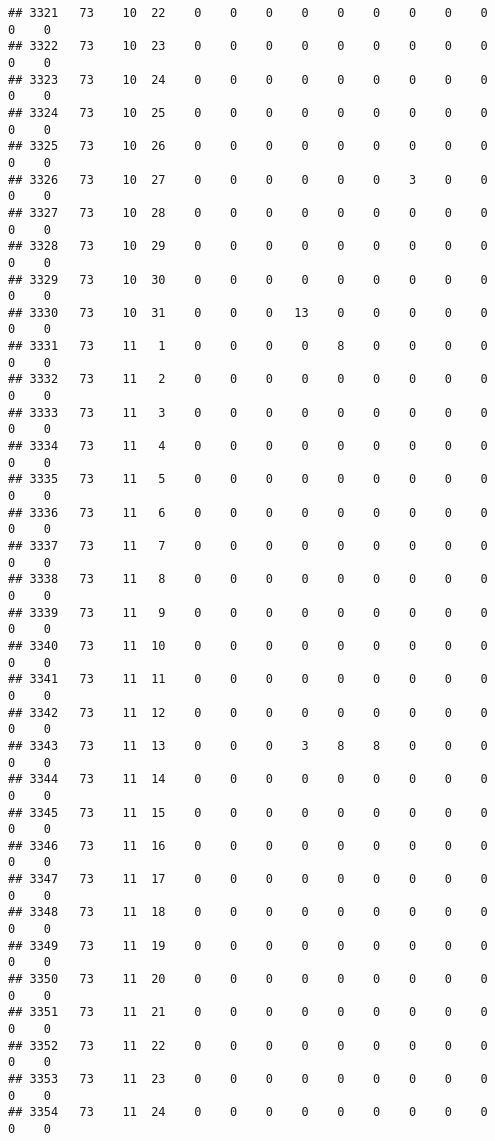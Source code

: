 \documentclass[]{article}
\begin{document}
\begin{verbatim}
## 3321   73    10  22    0    0    0    0    0    0    0    0    0    0    0
## 3322   73    10  23    0    0    0    0    0    0    0    0    0    0    0
## 3323   73    10  24    0    0    0    0    0    0    0    0    0    0    0
## 3324   73    10  25    0    0    0    0    0    0    0    0    0    0    0
## 3325   73    10  26    0    0    0    0    0    0    0    0    0    0    0
## 3326   73    10  27    0    0    0    0    0    0    3    0    0    0    0
## 3327   73    10  28    0    0    0    0    0    0    0    0    0    0    0
## 3328   73    10  29    0    0    0    0    0    0    0    0    0    0    0
## 3329   73    10  30    0    0    0    0    0    0    0    0    0    0    0
## 3330   73    10  31    0    0    0   13    0    0    0    0    0    0    0
## 3331   73    11   1    0    0    0    0    8    0    0    0    0    0    0
## 3332   73    11   2    0    0    0    0    0    0    0    0    0    0    0
## 3333   73    11   3    0    0    0    0    0    0    0    0    0    0    0
## 3334   73    11   4    0    0    0    0    0    0    0    0    0    0    0
## 3335   73    11   5    0    0    0    0    0    0    0    0    0    0    0
## 3336   73    11   6    0    0    0    0    0    0    0    0    0    0    0
## 3337   73    11   7    0    0    0    0    0    0    0    0    0    0    0
## 3338   73    11   8    0    0    0    0    0    0    0    0    0    0    0
## 3339   73    11   9    0    0    0    0    0    0    0    0    0    0    0
## 3340   73    11  10    0    0    0    0    0    0    0    0    0    0    0
## 3341   73    11  11    0    0    0    0    0    0    0    0    0    0    0
## 3342   73    11  12    0    0    0    0    0    0    0    0    0    0    0
## 3343   73    11  13    0    0    0    3    8    8    0    0    0    0    0
## 3344   73    11  14    0    0    0    0    0    0    0    0    0    0    0
## 3345   73    11  15    0    0    0    0    0    0    0    0    0    0    0
## 3346   73    11  16    0    0    0    0    0    0    0    0    0    0    0
## 3347   73    11  17    0    0    0    0    0    0    0    0    0    0    0
## 3348   73    11  18    0    0    0    0    0    0    0    0    0    0    0
## 3349   73    11  19    0    0    0    0    0    0    0    0    0    0    0
## 3350   73    11  20    0    0    0    0    0    0    0    0    0    0    0
## 3351   73    11  21    0    0    0    0    0    0    0    0    0    0    0
## 3352   73    11  22    0    0    0    0    0    0    0    0    0    0    0
## 3353   73    11  23    0    0    0    0    0    0    0    0    0    0    0
## 3354   73    11  24    0    0    0    0    0    0    0    0    0    0    0

\end{verbatim}
\end{document}
